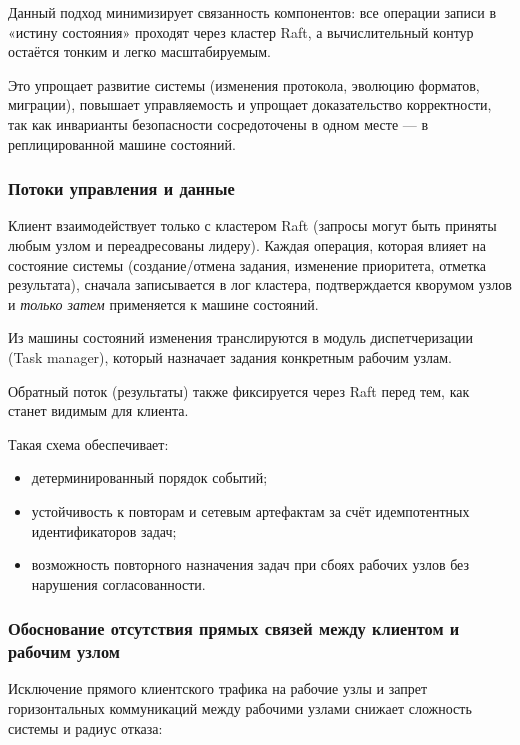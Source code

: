 Данный подход минимизирует связанность компонентов: все операции записи в
«истину состояния» проходят через кластер Raft, а вычислительный контур
остаётся тонким и легко масштабируемым.

Это упрощает развитие системы (изменения протокола, эволюцию форматов,
миграции), повышает управляемость и упрощает доказательство корректности, так
как инварианты безопасности сосредоточены в одном месте — в реплицированной
машине состояний.

\subsubsection{Потоки управления и данные}

Клиент взаимодействует только с кластером Raft (запросы могут быть приняты
любым узлом и переадресованы лидеру). Каждая операция, которая влияет на
состояние системы (создание/отмена задания, изменение приоритета, отметка
результата), сначала записывается в лог кластера, подтверждается кворумом узлов
и \emph{только затем} применяется к машине состояний.

Из машины состояний изменения транслируются в модуль диспетчеризации (Task
manager), который назначает задания конкретным рабочим узлам.

Обратный поток (результаты) также фиксируется через Raft перед тем, как станет
видимым для клиента.

Такая схема обеспечивает:
\begin{itemize}
    \item детерминированный порядок событий;
    \item устойчивость к повторам и сетевым артефактам за счёт идемпотентных
    идентификаторов задач;
    \item возможность повторного назначения задач при сбоях рабочих узлов без
    нарушения согласованности.
\end{itemize}

\subsubsection{Обоснование отсутствия прямых связей между клиентом и рабочим узлом}

Исключение прямого клиентского трафика на рабочие узлы и запрет горизонтальных
коммуникаций между рабочими узлами снижает сложность системы и радиус отказа:

